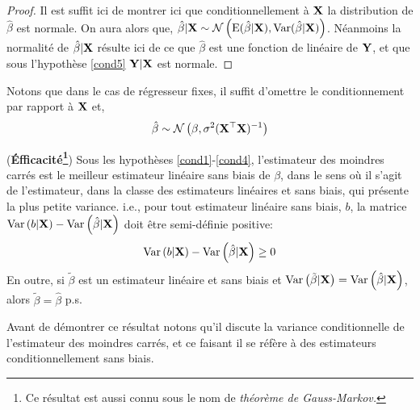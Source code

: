 \begin{proof}
Il est suffit ici de montrer ici que conditionnellement à $\mathbf X $ la distribution de $\hat{\beta}$ est normale. On aura alors que, $\hat{\beta} | \mathbf X \sim \mathcal{N}\left(\operatorname{E}(\hat{\beta}| \mathbf X ), \operatorname{Var}(\hat{\beta} | \mathbf X )\right)$. Néanmoins la normalité de $\hat{\beta} | \mathbf X $ résulte ici de ce que $\hat{\beta}$ est une fonction de linéaire de $\mathbf Y$, et que sous l'hypothèse \eqref{cond5} $\mathbf Y|\mathbf X $ est normale.
\end{proof}
Notons que dans le cas de régresseur fixes, il suffit d'omettre le conditionnement par rapport à $\mathbf X $ et,
\begin{align*}
\hat{\beta}\sim\mathcal{N}\left(\beta, \sigma^2(\mathbf X ^\top\mathbf X )^{-1}\right)
\end{align*}
\begin{propriete}(\textbf{\'Efficacité\footnote{Ce résultat est aussi connu sous le nom de \emph{théorème de Gauss-Markov.}}}) Sous les hypothèses \eqref{cond1}-\eqref{cond4}, l'estimateur des moindres carrés est le meilleur estimateur linéaire sans biais de $\beta$, dans le sens où il s'agit de l'estimateur, dans la classe des estimateurs linéaires et sans biais, qui présente la plus petite variance. i.e., pour tout estimateur linéaire sans biais, $b$, la matrice $\operatorname{Var}\left(b|\mathbf X \right)-\operatorname{Var}\left(\hat{\beta}|\mathbf X \right)$ doit être semi-définie positive:
\begin{align*}
\operatorname{Var}\left(b|\mathbf X \right)-\operatorname{Var}\left(\hat{\beta}|\mathbf X \right) \geq 0
\end{align*}
En outre, si $\tilde{\beta}$ est un estimateur linéaire et sans biais et 
$\operatorname{Var}\left(\tilde{\beta}|\mathbf X \right) = \operatorname{Var}\left(\hat{\beta}|\mathbf X \right)$, alors $\tilde{\beta} = \hat{\beta}$ p.s.
\end{propriete}
Avant de démontrer ce résultat notons qu'il discute la variance conditionnelle de l'estimateur des moindres carrés, et ce faisant il se réfère à des estimateurs conditionnellement sans biais.
